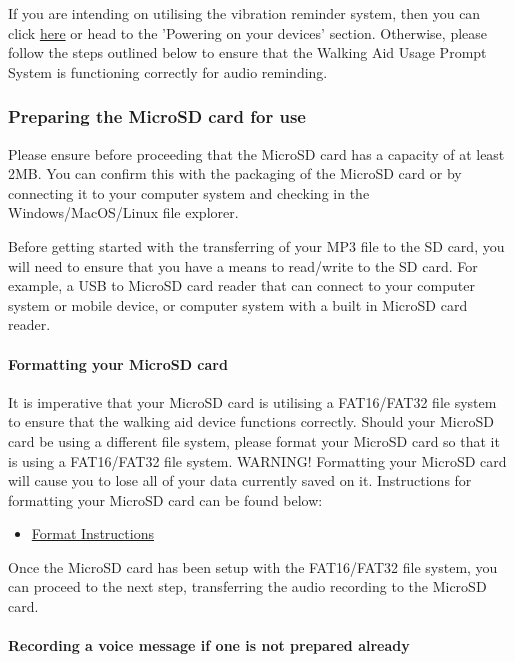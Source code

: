 			If you are intending on utilising the vibration reminder system, then you can click \hyperref[para:powering]{here} or head to the 'Powering on your devices' section. Otherwise, please follow the steps outlined below to ensure that the Walking Aid Usage Prompt System is functioning correctly for audio reminding.

			\subsubsection{Preparing the MicroSD card for use}

				Please ensure before proceeding that the MicroSD card has a capacity of at least 2MB. You can confirm this with the packaging of the MicroSD card or by connecting it to your computer system and checking in the Windows/MacOS/Linux file explorer.

				Before getting started with the transferring of your MP3 file to the SD card, you will need to ensure that you have a means to read/write to the SD card. For example, a USB to MicroSD card reader that can connect to your computer system or mobile device, or computer system with a built in MicroSD card reader.

				\paragraph{Formatting your MicroSD card}\mbox{}

				It is imperative that your MicroSD card is utilising a FAT16/FAT32 file system to ensure that the walking aid device functions correctly. Should your MicroSD card be using a different file system, please format your MicroSD card so that it is using a FAT16/FAT32 file system. WARNING! Formatting your MicroSD card will cause you to lose all of your data currently saved on it. Instructions for formatting your MicroSD card can be found below:

				\begin{itemize}
					\item \href{https://www.bu.edu/comtech/students/technical-guides/hardware/how-to-format-hard-drives/}{Format Instructions}
				\end{itemize}

				Once the MicroSD card has been setup with the FAT16/FAT32 file system, you can proceed to the next step, transferring the audio recording to the MicroSD card.

				\paragraph{Recording a voice message if one is not prepared already}\mbox{}

